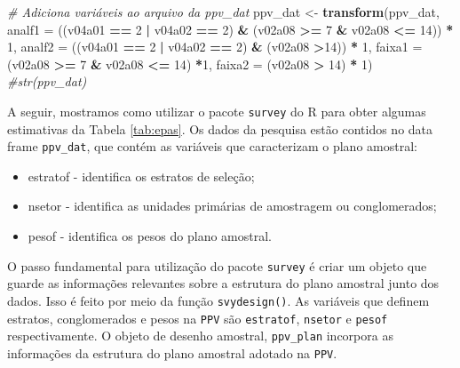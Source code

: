 \documentclass[]{book}
\newenvironment{Shaded}{\begin{snugshade}}{\end{snugshade}}
\newcommand{\KeywordTok}[1]{\textcolor[rgb]{0.13,0.29,0.53}{\textbf{#1}}}
\newcommand{\DataTypeTok}[1]{\textcolor[rgb]{0.13,0.29,0.53}{#1}}
\newcommand{\DecValTok}[1]{\textcolor[rgb]{0.00,0.00,0.81}{#1}}
\newcommand{\StringTok}[1]{\textcolor[rgb]{0.31,0.60,0.02}{#1}}
\newcommand{\CommentTok}[1]{\textcolor[rgb]{0.56,0.35,0.01}{\textit{#1}}}
\newcommand{\OperatorTok}[1]{\textcolor[rgb]{0.81,0.36,0.00}{\textbf{#1}}}
\newcommand{\NormalTok}[1]{#1}
\providecommand{\tightlist}{%
  \setlength{\itemsep}{0pt}\setlength{\parskip}{0pt}}
\theoremstyle{definition}
\theoremstyle{definition}
\theoremstyle{definition}
\theoremstyle{remark}
\begin{document}
\begin{Shaded}
\begin{Highlighting}[]
\CommentTok{# Adiciona variáveis ao arquivo da ppv_dat}
\NormalTok{ppv_dat <-}\StringTok{ }\KeywordTok{transform}\NormalTok{(ppv_dat, }
\DataTypeTok{analf1 =}\NormalTok{ ((v04a01 }\OperatorTok{==}\StringTok{ }\DecValTok{2} \OperatorTok{|}\StringTok{ }\NormalTok{v04a02 }\OperatorTok{==}\StringTok{ }\DecValTok{2}\NormalTok{) }\OperatorTok{&}\StringTok{ }\NormalTok{(v02a08 }\OperatorTok{>=}\StringTok{ }\DecValTok{7} \OperatorTok{&}\StringTok{ }\NormalTok{v02a08 }\OperatorTok{<=}\StringTok{ }\DecValTok{14}\NormalTok{)) }\OperatorTok{*}\StringTok{ }\DecValTok{1}\NormalTok{, }
\DataTypeTok{analf2 =}\NormalTok{ ((v04a01 }\OperatorTok{==}\StringTok{ }\DecValTok{2} \OperatorTok{|}\StringTok{ }\NormalTok{v04a02 }\OperatorTok{==}\StringTok{ }\DecValTok{2}\NormalTok{) }\OperatorTok{&}\StringTok{ }\NormalTok{(v02a08 }\OperatorTok{>}\DecValTok{14}\NormalTok{)) }\OperatorTok{*}\StringTok{ }\DecValTok{1}\NormalTok{, }
\DataTypeTok{faixa1 =}\NormalTok{ (v02a08 }\OperatorTok{>=}\StringTok{ }\DecValTok{7} \OperatorTok{&}\StringTok{ }\NormalTok{v02a08 }\OperatorTok{<=}\StringTok{ }\DecValTok{14}\NormalTok{) }\OperatorTok{*}\DecValTok{1}\NormalTok{, }
\DataTypeTok{faixa2 =}\NormalTok{ (v02a08 }\OperatorTok{>}\StringTok{ }\DecValTok{14}\NormalTok{) }\OperatorTok{*}\StringTok{ }\DecValTok{1}\NormalTok{)}
\CommentTok{#str(ppv_dat)}
\end{Highlighting}
\end{Shaded}

A seguir, mostramos como utilizar o pacote \texttt{survey}
\citep{R-survey} do R para obter algumas estimativas da Tabela
\ref{tab:epas}. Os dados da pesquisa estão contidos no data frame
\texttt{ppv\_dat}, que contém as variáveis que caracterizam o plano
amostral:

\begin{itemize}
\tightlist
\item
  estratof - identifica os estratos de seleção;
\item
  nsetor - identifica as unidades primárias de amostragem ou
  conglomerados;
\item
  pesof - identifica os pesos do plano amostral.
\end{itemize}

O passo fundamental para utilização do pacote \texttt{survey}
\citep{R-survey} é criar um objeto que guarde as informações relevantes
sobre a estrutura do plano amostral junto dos dados. Isso é feito por
meio da função \texttt{svydesign()}. As variáveis que definem estratos,
conglomerados e pesos na \texttt{PPV} são \texttt{estratof},
\texttt{nsetor} e \texttt{pesof} respectivamente. O objeto de desenho
amostral, \texttt{ppv\_plan} incorpora as informações da estrutura do
plano amostral adotado na \texttt{PPV}.
\end{document}
